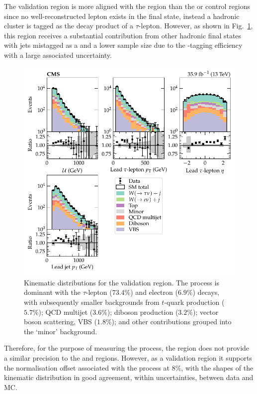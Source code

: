 The \tauplusjets validation region is more aligned with the \metplusjets
region than the \muplusjets or \eleplusjets control regions since no
well-reconstructed lepton exists in the final state, instead a hadronic
cluster is tagged as the decay product of a $\tau$-lepton. However, as shown
in Fig.~\ref{fig:tauplusjets}, this region receives a substantial
contribution from other hadronic final states with jets mistagged as a \Ptauh
and a lower sample size due to the \Ptauh-tagging efficiency with a large
associated uncertainty.
%
\begin{figure}[htb]
    \centering
    \includegraphics{chapters/042_backgrounds/images/singletau_dists.pdf}
    \caption[Single hadronic $\tau$-lepton final state kinematics.]{
        Kinematic distributions for the \tauplusjets validation region. The \IWj process is dominant with the $\tau$-lepton ($73.4\%$) and electron ($6.9\%$) decays, with subsequently smaller backgrounds from $t$-quark production ($5.7\%$); QCD multijet ($3.6\%$); diboson production ($3.2\%$); vector boson scattering, VBS ($1.8\%$); and other contributions grouped into the `minor' background.
    }
    \label{fig:tauplusjets}
\end{figure}
%
Therefore, for the purpose of measuring the \IWj process, the \tauplusjets
region does not provide a similar precision to the \muplusjets and \eleplusjets regions. However,
as a validation region it supports the normalisation offset associated with
the \IWj process at $8\%$, with the shapes of the kinematic distribution in good
agreement, within uncertainties, between data and MC.


